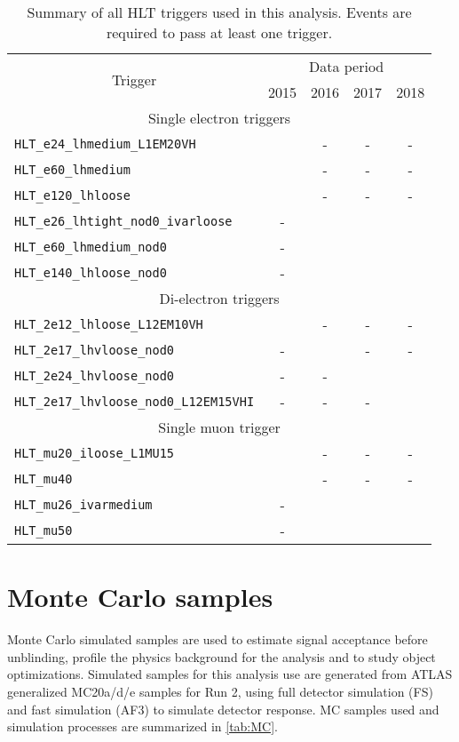 \documentclass[../thesis.tex]{subfiles}
\begin{document}
\begin{table}[!ht]
\centering
\caption{\label{tab:ana:trigger}Summary of all \acs{HLT} triggers used in this analysis. Events are required to pass at least one trigger.}%
\begin{tabular}{p{9cm}|cccc}
\toprule\toprule
\multicolumn{1}{c|}{\multirow{ 2}{*}{Trigger}}	& \multicolumn{4}{c}{Data period} \\
\multicolumn{1}{c|}{}							& 2015	& 2016	& 2017	& 2018 \\
\midrule
\multicolumn{5}{c}{Single electron triggers} \\
\midrule
\verb|HLT_e24_lhmedium_L1EM20VH| 		& \checkmark & - & - & - \\
\verb|HLT_e60_lhmedium|					& \checkmark & - & - & - \\
\verb|HLT_e120_lhloose|					& \checkmark & - & - & - \\
\verb|HLT_e26_lhtight_nod0_ivarloose|	& - & \checkmark & \checkmark & \checkmark \\
\verb|HLT_e60_lhmedium_nod0|			& - & \checkmark & \checkmark & \checkmark \\
\verb|HLT_e140_lhloose_nod0|			& - & \checkmark & \checkmark & \checkmark \\
\midrule
\multicolumn{5}{c}{Di-electron triggers} \\
\midrule
\verb|HLT_2e12_lhloose_L12EM10VH |		& \checkmark & - & - & - \\
\verb|HLT_2e17_lhvloose_nod0| 			& - & \checkmark & - & - \\
\verb|HLT_2e24_lhvloose_nod0| 			& - & - & \checkmark & \checkmark \\
\verb|HLT_2e17_lhvloose_nod0_L12EM15VHI| 	& - & - & - & \checkmark \\
\midrule
\multicolumn{5}{c}{Single muon trigger} \\
\midrule
\verb|HLT_mu20_iloose_L1MU15| 			& \checkmark & - & - & - \\
\verb|HLT_mu40|							& \checkmark & - & - & - \\
\verb|HLT_mu26_ivarmedium| 				& - & \checkmark & \checkmark & \checkmark \\
\verb|HLT_mu50|							& - & \checkmark & \checkmark & \checkmark \\
\bottomrule\bottomrule
\end{tabular}
\end{table}

\section{Monte Carlo samples}
\label{sec:montecarlo}
Monte Carlo simulated samples are used to estimate signal acceptance before unblinding, profile the physics background for the analysis and to study object optimizations. Simulated samples for this analysis use are generated from ATLAS generalized MC20a/d/e samples for Run 2, using full detector simulation (\acs{FS}) and fast simulation (\acs{AF3}) to simulate detector response. \acs{MC} samples used and simulation processes are summarized in \autoref{tab:MC}.
\end{document}
